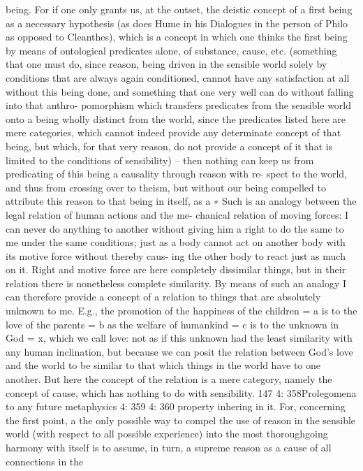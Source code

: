 being.
For if one only grants us, at the outset, the deistic concept of a ﬁrst
being as a necessary hypothesis (as does Hume in his Dialogues in the
person of Philo as opposed to Cleanthes), which is a concept in which
one thinks the ﬁrst being by means of ontological predicates alone, of
substance, cause, etc. (something that one must do, since reason, being
driven in the sensible world solely by conditions that are always again
conditioned, cannot have any satisfaction at all without this being done,
and something that one very well can do without falling into that anthro-
pomorphism which transfers predicates from the sensible world onto a
being wholly distinct from the world, since the predicates listed here are
mere categories, which cannot indeed provide any determinate concept
of that being, but which, for that very reason, do not provide a concept
of it that is limited to the conditions of sensibility) – then nothing can
keep us from predicating of this being a causality through reason with re-
spect to the world, and thus from crossing over to theism, but without
our being compelled to attribute this reason to that being in itself, as a
∗
Such is an analogy between the legal relation of human actions and the me-
chanical relation of moving forces: I can never do anything to another without
giving him a right to do the same to me under the same conditions; just as a
body cannot act on another body with its motive force without thereby caus-
ing the other body to react just as much on it. Right and motive force are here
completely dissimilar things, but in their relation there is nonetheless complete
similarity. By means of such an analogy I can therefore provide a concept of a
relation to things that are absolutely unknown to me. E.g., the promotion of
the happiness of the children = a is to the love of the parents = b as the welfare
of humankind = c is to the unknown in God = x, which we call love: not as if
this unknown had the least similarity with any human inclination, but because
we can posit the relation between God’s love and the world to be similar to
that which things in the world have to one another. But here the concept of the
relation is a mere category, namely the concept of cause, which has nothing to
do with sensibility.
147
4: 358Prolegomena to any future metaphysics
4: 359
4: 360
property inhering in it. For, concerning the ﬁrst point, a the only possible
way to compel the use of reason in the sensible world (with respect to all
possible experience) into the most thoroughgoing harmony with itself is
to assume, in turn, a supreme reason as a cause of all connections in the

